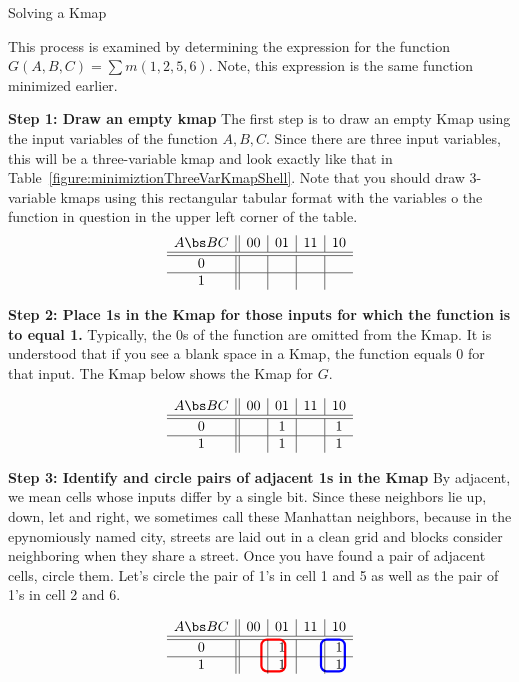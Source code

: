 \begin{process}{Solving a Kmap}
\label{process:minimizationKmap}

This process is examined by
determining the \SOPmin expression for the function
$G(A,B,C)=\sum m(1,2,5,6)$.  Note, this expression is the
same function minimized earlier.

\textbf{Step 1: Draw an empty kmap}
The first step is to draw an empty Kmap using the input variables of the function $A,B,C$.
Since there are three input variables, this will be a three-variable kmap and
look exactly like that in Table~\ref{figure:minimiztionThreeVarKmapShell}.
Note that you should draw  3-variable kmaps using this rectangular tabular format with
the variables o the function in question in the upper left corner of the table.
$$
\begin{array} {c||c|c|c|c}
A \bs BC & 00 & 01 & 11 & 10 \\ \hline \hline
0        &    &    &    &    \\ \hline
1        &    &    &    &    \\
\end{array} $$

\textbf{Step 2: Place 1s in the Kmap for those inputs for which the function is to equal 1.}
Typically, the 0s of the function are omitted from the Kmap.  It is understood that if
you see a blank space in a Kmap, the function equals 0 for that input.  The Kmap
below shows the Kmap for $G$.

$$
\begin{array} {c||c|c|c|c}
A \bs BC & 00 & 01 & 11 & 10 \\ \hline \hline
0        &    & 1  &    & 1  \\ \hline
1        &    & 1  &    & 1  \\
\end{array} $$

\textbf{Step 3: Identify and circle pairs of adjacent 1s in the Kmap}
By adjacent, we mean cells whose inputs differ by a single
bit.  Since these neighbors lie up, down, let and right, we
sometimes call these Manhattan neighbors, because in the
epynomiously named city, streets are laid out in a clean grid
and blocks consider neighboring when they share a street.
Once you have found a pair of adjacent cells, circle them.
Let's circle the pair of 1's in cell 1 and 5 as well as the pair
of 1's in cell 2 and 6.

$$
\begin{array} {c||c|c|c|c}
A \bs BC & 00 & 01 & 11 & 10 \\ \hline \hline
\begin{tikzpicture}[overlay]
    \draw[red,ultra thick,rounded corners]          (1.6,0.3) rectangle (2.2,-0.5);
    \draw[blue,ultra thick,rounded corners]          (3.1,0.3) rectangle (3.7,-0.5);
\end{tikzpicture}
0        &    & 1  &    & 1  \\ \hline
1        &    & 1  &    & 1  \\
\end{array} $$


\end{process}
